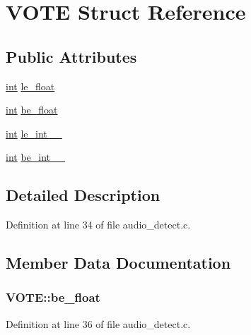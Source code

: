 \hypertarget{struct_v_o_t_e}{}\section{V\+O\+TE Struct Reference}
\label{struct_v_o_t_e}
\subsection*{Public Attributes}
\begin{DoxyCompactItemize}
\item 
\hyperlink{xmltok_8h_a5a0d4a5641ce434f1d23533f2b2e6653}{int} \hyperlink{struct_v_o_t_e_a311c0134856f2709bbd312296bca38b2}{le\+\_\+float}
\item 
\hyperlink{xmltok_8h_a5a0d4a5641ce434f1d23533f2b2e6653}{int} \hyperlink{struct_v_o_t_e_a96cbc32e99fe1d96fe4cc5be4f9195d2}{be\+\_\+float}
\item 
\hyperlink{xmltok_8h_a5a0d4a5641ce434f1d23533f2b2e6653}{int} \hyperlink{struct_v_o_t_e_afa8721777a8b8dab0a367e1724c4461b}{le\+\_\+int\+\_\+\_}
\item 
\hyperlink{xmltok_8h_a5a0d4a5641ce434f1d23533f2b2e6653}{int} \hyperlink{struct_v_o_t_e_aa3646ca2018f0d066cec6d306520d39d}{be\+\_\+int\+\_\+\_}
\end{DoxyCompactItemize}


\subsection{Detailed Description}


Definition at line 34 of file audio\+\_\+detect.\+c.



\subsection{Member Data Documentation}
\subsubsection[{\texorpdfstring{be\+\_\+float}{be_float}}]{ V\+O\+T\+E\+::be\+\_\+float}\hypertarget{struct_v_o_t_e_a96cbc32e99fe1d96fe4cc5be4f9195d2}{}\label{struct_v_o_t_e_a96cbc32e99fe1d96fe4cc5be4f9195d2}


Definition at line 36 of file audio\+\_\+detect.\+c.

